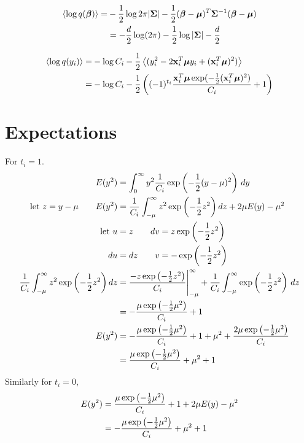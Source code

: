 \documentclass{article}
\begin{document}
\begin{align}
\nonumber\left\langle\log q(\bm{\beta})\right\rangle=&-\frac{1}{2}\log 2\pi|{\mathbf{\Sigma}}|-\frac{1}{2}(\bm{\beta}-{\boldsymbol{\mu}})^T{\mathbf{\Sigma}}^{-1}(\bm{\beta}-{\boldsymbol{\mu}})\\
&=-\frac{d}{2}\log(2\pi)-\frac{1}{2}\log|{\mathbf{\Sigma}}|-\frac{d}{2}
\end{align}

\begin{align}
\nonumber\left\langle\log q(y_i)\right\rangle=&-\log C_i-\frac{1}{2}\left\langle(y_i^2-2\mathbf{x}_i^T{\boldsymbol{\mu}} y_i+(\mathbf{x}_i^T{\boldsymbol{\mu}})^2)\right\rangle\\
=&-\log C_i-\frac{1}{2}\left((-1)^{t_i}\frac{\mathbf{x}_i^T{\boldsymbol{\mu}}\exp(-\frac{1}{2}(\mathbf{x}_i^T{\boldsymbol{\mu}})^2)}{C_i}+1\right)
\end{align}
\appendix

\section{Expectations}
For $t_i=1$.
\begin{align}
\nonumber E(y^2)&=\int_{0}^{\infty}y^2\frac{1}{C_i}\exp\left(-\frac{1}{2}(y-\mu)^2\right)\,dy \\
\nonumber \text{let }z=y-\mu \qquad E(y^2)&=\frac{1}{C_i}\int_{-\mu}^{\infty}z^2\exp\left(-\frac{1}{2}z^2\right)dz+2\mu E(y)-\mu^2\\
\nonumber \text{let } u&=z\qquad dv=z\exp\left(-\frac{1}{2}z^2\right)\\
\nonumber du&=dz \qquad v=-\exp\left(-\frac{1}{2}z^2\right)\\
\nonumber \frac{1}{C_i}\int_{-\mu}^{\infty}z^2\exp\left(-\frac{1}{2}z^2\right)dz &=\frac{-z\exp\left(-\frac{1}{2}z^2\right)}{C_i}\Bigg|_{-\mu}^\infty+\frac{1}{C_i}\int_{-\mu}^{\infty}\exp\left(-\frac{1}{2}z^2\right)\,dz\\
\nonumber &=-\frac{\mu\exp\left(-\frac{1}{2}\mu^2\right)}{C_i}+1\\
\nonumber E(y^2)&=-\frac{\mu\exp\left(-\frac{1}{2}\mu^2\right)}{C_i}+1+\mu^2+\frac{2\mu\exp\left(-\frac{1}{2}\mu^2\right)}{C_i}\\
&=\frac{\mu\exp\left(-\frac{1}{2}\mu^2\right)}{C_i}+\mu^2+1
\end{align}
Similarly for $t_i=0$,
\begin{align}
\nonumber E(y^2)&=\frac{\mu\exp\left(-\frac{1}{2}\mu^2\right)}{C_i}+1+2\mu E(y)-\mu^2\\
&=-\frac{\mu\exp\left(-\frac{1}{2}\mu^2\right)}{C_i}+\mu^2+1
\end{align}
\end{document}
